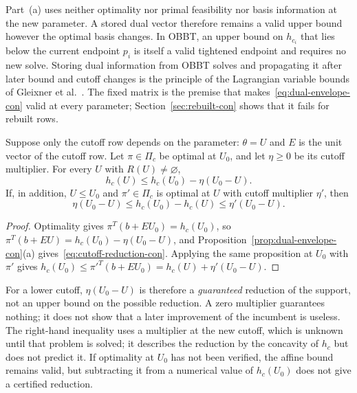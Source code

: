 Part~(a) uses neither optimality nor primal feasibility nor basis
information at the new parameter. A stored dual vector therefore remains a
valid upper bound however the optimal basis changes. In OBBT, an upper
bound on $h_{c_i}$ that lies below the current endpoint $p_i$ is itself a
valid tightened endpoint and requires no new solve. Storing dual
information from OBBT solves and propagating it after later bound and
cutoff changes is the principle of the Lagrangian variable bounds of
Gleixner et
al.~\cite{gleixner2017-three-enhancements-for-optimization-based}. The
fixed matrix is the premise that makes~\eqref{eq:dual-envelope-con} valid
at every parameter; Section~\ref{sec:rebuilt-con} shows that it fails for
rebuilt rows.

\begin{corollary}\label{cor:cutoff-multiplier-con}
Suppose only the cutoff row depends on the parameter: $\theta=U$ and
$E$ is the unit vector of the cutoff row. Let $\pi\in\Pi_c$ be optimal at
$U_0$, and let $\eta\ge0$ be its cutoff multiplier. For every $U$ with
$R(U)\ne\varnothing$,
\begin{equation}\label{eq:cutoff-reduction-con}
 h_c(U)\le h_c(U_0)-\eta(U_0-U).
\end{equation}
If, in addition, $U\le U_0$ and $\pi'\in\Pi_c$ is optimal at $U$ with
cutoff multiplier $\eta'$, then
\[
 \eta(U_0-U)\le h_c(U_0)-h_c(U)\le\eta'(U_0-U).
\]
\end{corollary}

\begin{proof}
Optimality gives $\pi^T(b+EU_0)=h_c(U_0)$, so
$\pi^T(b+EU)=h_c(U_0)-\eta(U_0-U)$, and
Proposition~\ref{prop:dual-envelope-con}(a)
gives~\eqref{eq:cutoff-reduction-con}. Applying the same proposition at
$U_0$ with $\pi'$ gives $h_c(U_0)\le\pi'^T(b+EU_0)=h_c(U)+\eta'(U_0-U)$.
\end{proof}

For a lower cutoff, $\eta(U_0-U)$ is therefore a \emph{guaranteed}
reduction of the support, not an upper bound on the possible reduction.
A zero multiplier guarantees nothing; it does not show that a later
improvement of the incumbent is useless. The right-hand inequality uses a
multiplier at the new cutoff, which is unknown until that problem is
solved; it describes the reduction by the concavity of $h_c$ but does not
predict it. If optimality at $U_0$ has not been verified, the affine
bound remains valid, but subtracting it from a numerical value of
$h_c(U_0)$ does not give a certified reduction.

